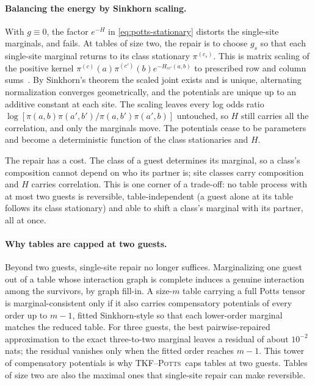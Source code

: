 \documentclass[11pt]{article}
\newcommand{\Potts}{\textsc{TKF--Potts}}
\newcommand{\eqm}{\pi}
\begin{document}
\paragraph{Balancing the energy by Sinkhorn scaling.} With $g\equiv0$, the
factor $e^{-H}$ in \cref{eq:potts-stationary} distorts the single-site
marginals, and  fails. At tables of size two, the
repair is to choose $g_s$ so that each single-site marginal returns to its
class stationary $\eqm^{(c_s)}$. This is matrix scaling of the positive kernel
$\eqm^{(c)}(a)\eqm^{(c')}(b)e^{-H_{cc'}(a,b)}$ to prescribed row and column
sums~\citep{deming1940,sinkhorn1967,cuturi2013}. By Sinkhorn's theorem the
scaled joint exists and is unique, alternating normalization converges
geometrically, and the potentials are unique up to an additive constant at
each site. The scaling leaves every log odds ratio
$\log[\eqm(a,b)\eqm(a',b')/\eqm(a,b')\eqm(a',b)]$ untouched, so $H$ still
carries all the correlation, and only the marginals move. The potentials
cease to be parameters and become a deterministic function of the class
stationaries and $H$.

The repair has a cost. The class of a guest determines its marginal, so a
class's composition cannot depend on who its partner is; site classes carry
composition and $H$ carries correlation. This is one corner of a trade-off:
no table process with at most two guests is reversible, table-independent (a
guest alone at its table follows its class stationary) and able to shift a
class's marginal with its partner, all at once.

\paragraph{Why tables are capped at two guests.} Beyond two guests,
single-site repair no longer suffices. Marginalizing one guest out of a table
whose interaction graph is complete induces a genuine interaction among the
survivors, by graph fill-in. A size-$m$ table carrying a full Potts tensor is
marginal-consistent only if it also carries compensatory potentials of every
order up to $m-1$, fitted Sinkhorn-style so that each lower-order marginal
matches the reduced table. For three guests, the best pairwise-repaired
approximation to the exact three-to-two marginal leaves a residual of about
$10^{-2}$ nats; the residual vanishes only when the fitted order reaches
$m-1$. This tower of compensatory potentials is why \Potts\ caps tables at
two guests. Tables of size two are also the maximal ones that single-site
repair can make reversible.
\end{document}
